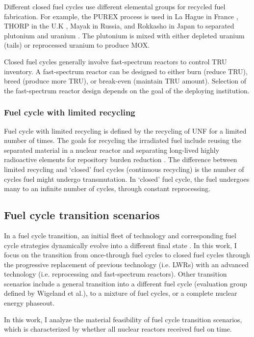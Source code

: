 Different closed fuel cycles use different elemental groups for recycled
fuel fabrication. For example, the PUREX process is used in La Hague in France
\cite{schneider_spent_2008}, THORP in the U.K \cite{riley_technology_1998},
Mayak in Russia, and Rokkasho in Japan to separated plutonium and uranium
\cite{birkett_recent_2005}. The plutonium is mixed with either depleted
uranium (tails) or reprocessed uranium to produce \gls{MOX}.

Closed fuel cycles
generally involve fast-spectrum reactors to control TRU inventory.
A fast-spectrum reactor can be designed to either burn (reduce TRU),
breed (produce more TRU), or break-even (maintain TRU amount).
Selection of the fast-spectrum reactor design depends on the
goal of the deploying institution.


\subsubsection{Fuel cycle with limited recycling}
Fuel cycle with limited recycling is defined by the recycling of \gls{UNF}
for a limited number of times. 
The goals for recycling the irradiated fuel include
reusing the separated material in a nuclear reactor and 
separating long-lived highly radioactive elements
for repository burden reduction \cite{wigeland_nuclear_2014}.
The difference
between limited recycling and `closed' fuel cycles (continuous
recycling) is the number of cycles fuel might undergo transmutation.
In `closed' fuel cycle, the fuel undergoes many to an infinite number
of cycles, through constant reprocessing.


\subsection{Fuel cycle transition scenarios}
In a fuel cycle transition, an initial fleet of technology and corresponding
fuel cycle strategies dynamically evolve into a different final state \cite{oecd_nuclear_2009}.
In this work, I focus on the transition from
once-through fuel cycles to closed fuel
cycles through the progressive replacement of previous technology
(i.e. \glspl{LWR}) with an advanced technology (i.e. reprocessing
and fast-spectrum reactors). Other transition scenarios include
a general transition into a different fuel cycle (evaluation group
defined by Wigeland et al.), to a mixture of fuel cycles, or
a complete nuclear energy phaseout.

In this work, I analyze the material feasibility of fuel
cycle transition scenarios, which is characterized by whether
all nuclear reactors received fuel on time.

